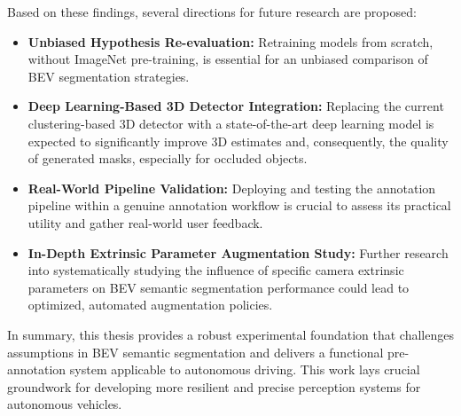 Based on these findings, several directions for future research are proposed:
\begin{itemize}
    \item \textbf{Unbiased Hypothesis Re-evaluation:} Retraining models from scratch, without ImageNet pre-training, is essential for an unbiased comparison of BEV segmentation strategies.
    \item \textbf{Deep Learning-Based 3D Detector Integration:} Replacing the current clustering-based 3D detector with a state-of-the-art deep learning model is expected to significantly improve 3D estimates and, consequently, the quality of generated masks, especially for occluded objects.
    \item \textbf{Real-World Pipeline Validation:} Deploying and testing the annotation pipeline within a genuine annotation workflow is crucial to assess its practical utility and gather real-world user feedback.
    \item \textbf{In-Depth Extrinsic Parameter Augmentation Study:} Further research into systematically studying the influence of specific camera extrinsic parameters on BEV semantic segmentation performance could lead to optimized, automated augmentation policies.
\end{itemize}

In summary, this thesis provides a robust experimental foundation that challenges assumptions in BEV semantic segmentation and delivers a functional pre-annotation system applicable to autonomous driving. This work lays crucial groundwork for developing more resilient and precise perception systems for autonomous vehicles.






































